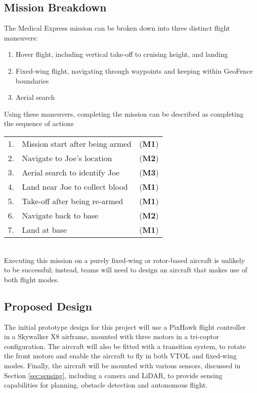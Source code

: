 \subsection{Mission Breakdown}
\label{sec:flightmaneuvers}
The Medical Express mission can be broken down into three distinct flight maneuvers:
\begin{enumerate}[label=\bfseries M\arabic*:] \itemsep-2pt
	\item Hover flight, including vertical take-off to cruising height, and landing
	\item Fixed-wing flight, navigating through waypoints and keeping within GeoFence boundaries
	\item Aerial search
\end{enumerate}

Using these maneuvers, completing the mission can be described as completing the sequence of actions\\
\begin{tabular}{r l l}
	1. & Mission start after being armed & (\textbf{M1}) \\ 
	2. & Navigate to Joe's location & (\textbf{M2}) \\ 
	3. & Aerial search to identify Joe & (\textbf{M3}) \\ 
	4. & Land near Joe to collect blood & (\textbf{M1}) \\ 
	5. & Take-off after being re-armed & (\textbf{M1}) \\ 
	6. & Navigate back to base & (\textbf{M2}) \\ 
	7. & Land at base & (\textbf{M1}) \\ 
\end{tabular}\\

Executing this mission on a purely fixed-wing or rotor-based aircraft is unlikely to be successful; instead, teams will need to design an aircraft that makes use of both flight modes.

\subsection{Proposed Design}
The initial prototype design for this project will use a PixHawk flight controller in a Skywalker X8 airframe, mounted with three motors in a tri-coptor configuration. The aircraft will also be fitted with a transition system, to rotate the front motors and enable the aircraft to fly in both VTOL and fixed-wing modes. Finally, the aircraft will be mounted with various sensors, discussed in Section \ref{sec:sensing}, including a camera and LiDAR, to provide sensing capabilities for planning, obstacle detection and autonomous flight.\\

